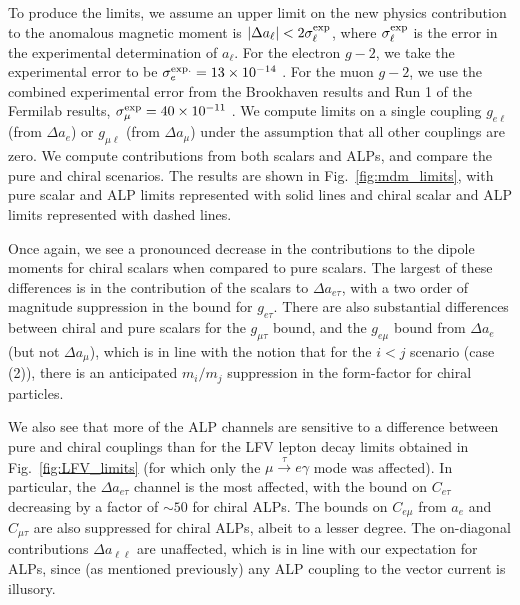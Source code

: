 {To produce the limits, we assume an upper limit on the new physics contribution to the anomalous magnetic moment is $|\Delta a_\ell| < 2\sigma_\ell^{\rm exp}$, where $\sigma_{\ell}^{\rm exp}$ is the error in the experimental determination of $a_\ell$. For the electron $g-2$, we take the experimental error to be $\sigma_e^{\rm exp.} = 13\times 10^{-14}$ \cite{Fan:2022eto}. For the muon $g-2$, we use the combined experimental error from the Brookhaven results and Run 1 of the Fermilab results, $\sigma_\mu^{\rm exp} = 40\times 10^{-11}$ \cite{Muong-2:2021ojo}. We compute limits on a single coupling $g_{e\ell}$ (from $\Delta a_e$) or $g_{\mu\ell}$ (from $\Delta a_{\mu}$) under the assumption that all other couplings are zero. We compute contributions from both scalars and ALPs, and compare the pure and chiral scenarios. The results are shown in Fig.~\ref{fig:mdm_limits}, with pure scalar and ALP limits represented with solid lines and chiral scalar and ALP limits represented with dashed lines. 

Once again, we see a pronounced decrease in the contributions to the dipole moments for chiral scalars when compared to pure scalars. The largest of these differences is in the contribution of the scalars to $\Delta a_{e\tau}$, with a two order of magnitude suppression in the bound for $g_{e\tau}$. There are also substantial differences between chiral and pure scalars for the $g_{\mu \tau}$ bound, and the $g_{e\mu}$ bound from $\Delta a_{e}$ (but not $\Delta a_\mu$), which is in line with the notion that for the $i < j$ scenario (case (2)), there is an anticipated $m_i/m_j$ suppression in the form-factor for chiral particles.

We also see that more of the ALP channels are sensitive to a difference between pure and chiral couplings than for the LFV lepton decay limits obtained in Fig.~\ref{fig:LFV_limits} (for which only the $\mu \stackrel{\tau}{\longrightarrow}e\gamma$ mode was affected). In particular, the $\Delta a_{e\tau}$ channel is the most affected, with the bound on $C_{e\tau}$ decreasing by a factor of $\sim 50$ for chiral ALPs. The bounds on $C_{e\mu}$ from $a_e$ and $C_{\mu\tau}$ are also suppressed for chiral ALPs, albeit to a lesser degree. The on-diagonal contributions $\Delta a_{\ell\ell}$ are unaffected, which is in line with our expectation for ALPs, since (as mentioned previously) any ALP coupling to the vector current is illusory.

}

